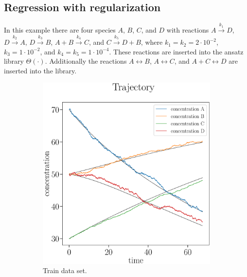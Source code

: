 \documentclass[oneside, abstracton, titlepage]{scrartcl}
\begin{document}
	\subsection{Regression with regularization}
	\label{sec:ex2}
	In this example there are four species $A$, $B$, $C$, and $D$ with reactions $A\xrightarrow{k_1}D$, $D\xrightarrow{k_2}A$, $D\xrightarrow{k_3}B$, $A+B\xrightarrow{k_4}C$, and $C\xrightarrow{k_5}D+B$, where $k_1=k_2=2\cdot 10^{-2}$, $k_3 = 1\cdot 10^{-2}$, and $k_4=k_5=1\cdot 10^{-4}$. These reactions are inserted into the ansatz library $\Theta (\cdot)$. Additionally the reactions $A\leftrightarrow B$, $A\leftrightarrow C$, and $A+C\leftrightarrow D$ are inserted into the library. 
	
	\begin{figure}
		\centering
		\begin{subfigure}[b]{.45\textwidth}
			\includegraphics[width=\textwidth]{./figures_tex/cv_concentrations_train}
			\caption{Train data set.}
		\end{subfigure}
		~
		\begin{subfigure}[b]{.45\textwidth}

\end{subfigure}
\end{figure}
\end{document}
